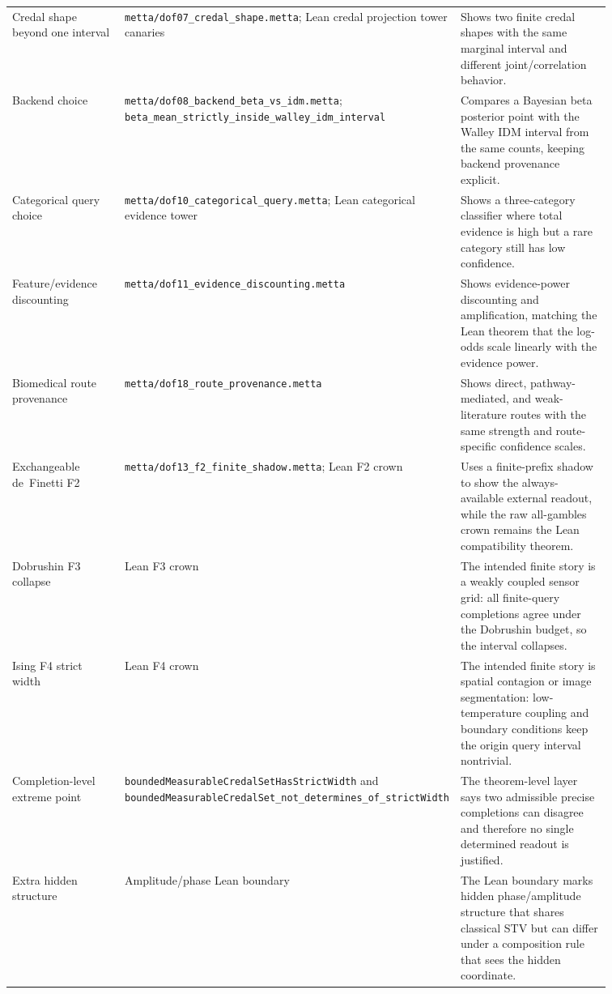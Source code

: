\documentclass[]{article}
\newcommand{\lid}[1]{{\ttfamily\nolinkurl{#1}}}
\newcommand{\lpath}[1]{\texttt{\nolinkurl{#1}}}
\begin{document}
\begin{longtable}{p{0.22\linewidth}p{0.28\linewidth}p{0.36\linewidth}}
Credal shape beyond one interval &
\lpath{metta/dof07_credal_shape.metta};
Lean credal projection tower canaries &
Shows two finite credal shapes with the same marginal interval and different
joint/correlation behavior. \\

Backend choice &
\lpath{metta/dof08_backend_beta_vs_idm.metta};
\lid{beta\_mean\_strictly\_inside\_walley\_idm\_interval} &
Compares a Bayesian beta posterior point with the Walley IDM interval from the
same counts, keeping backend provenance explicit. \\

Categorical query choice &
\lpath{metta/dof10_categorical_query.metta};
Lean categorical evidence tower &
Shows a three-category classifier where total evidence is high but a rare
category still has low confidence. \\

Feature/evidence discounting &
\lpath{metta/dof11_evidence_discounting.metta} &
Shows evidence-power discounting and amplification, matching the Lean theorem
that the log-odds scale linearly with the evidence power. \\

Biomedical route provenance &
\lpath{metta/dof18_route_provenance.metta} &
Shows direct, pathway-mediated, and weak-literature routes with the same
strength and route-specific confidence scales. \\

Exchangeable de~Finetti F2 &
\lpath{metta/dof13_f2_finite_shadow.metta};
Lean F2 crown &
Uses a finite-prefix shadow to show the always-available external readout,
while the raw all-gambles crown remains the Lean compatibility theorem. \\

Dobrushin F3 collapse &
Lean F3 crown &
The intended finite story is a weakly coupled sensor grid: all finite-query
completions agree under the Dobrushin budget, so the interval collapses. \\

Ising F4 strict width &
Lean F4 crown &
The intended finite story is spatial contagion or image segmentation:
low-temperature coupling and boundary conditions keep the origin query
interval nontrivial. \\

Completion-level extreme point &
\lid{boundedMeasurableCredalSetHasStrictWidth} and
\lid{boundedMeasurableCredalSet\_not\_determines\_of\_strictWidth} &
The theorem-level layer says two admissible precise completions can disagree
and therefore no single determined readout is justified. \\

Extra hidden structure &
Amplitude/phase Lean boundary &
The Lean boundary marks hidden phase/amplitude structure that shares classical
STV but can differ under a composition rule that sees the hidden coordinate. \\
\bottomrule
\end{longtable}
\end{document}
